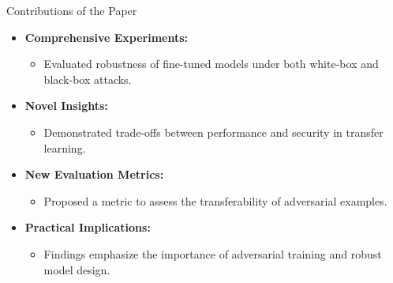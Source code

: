 \begin{frame}{Contributions of the Paper}
    \begin{itemize}
        \item \textbf{Comprehensive Experiments:}
        \begin{itemize}
            \item Evaluated robustness of fine-tuned models under both white-box and black-box attacks.
        \end{itemize}
        \item \textbf{Novel Insights:}
        \begin{itemize}
            \item Demonstrated trade-offs between performance and security in transfer learning.
        \end{itemize}
        \item \textbf{New Evaluation Metrics:}
        \begin{itemize}
            \item Proposed a metric to assess the transferability of adversarial examples.
        \end{itemize}
        \item \textbf{Practical Implications:}
        \begin{itemize}
            \item Findings emphasize the importance of adversarial training and robust model design.
        \end{itemize}
    \end{itemize}
\end{frame}


        
